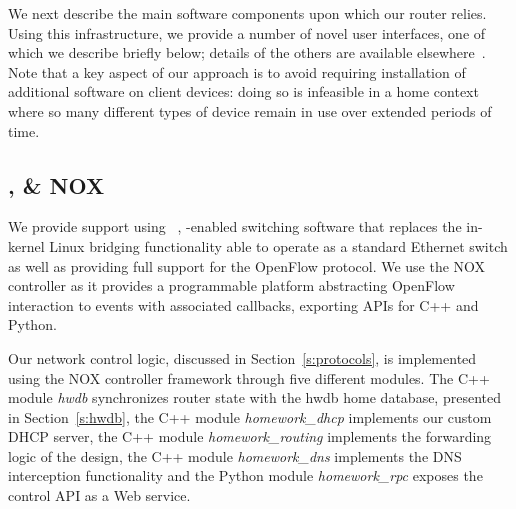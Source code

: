We next describe the main software components upon which our router relies.
Using this infrastructure, we provide a number of novel user interfaces, one of
which we describe briefly below; details of the others are available
elsewhere~\cite{mortier11:_suppor_novel_home_networ_manag}.  Note that a key
aspect of our approach is to avoid requiring installation of additional
software on client devices: doing so is infeasible in a home context where so
many different types of device remain in use over extended periods of time.

\subsection{\of, \ovs \& NOX} \label{s:openflow}

We provide \of support using \ovs~\cite{openvswitch}, \of-enabled switching
software that replaces the in-kernel Linux bridging functionality able to
operate as a standard Ethernet switch as well as providing full support for the
OpenFlow protocol.  We use the NOX~\cite{nox} controller as it provides a
programmable platform abstracting OpenFlow interaction to events with associated
callbacks, exporting APIs for C++ and Python.

Our network control logic, discussed in Section~\ref{s:protocols}, is implemented
using the NOX controller framework through five different modules. The
C++ module {\it hwdb} synchronizes router state with the hwdb home database,
presented in Section~\ref{s:hwdb}, the C++ module {\it homework\_dhcp}
implements our custom DHCP server, the C++ module {\it homework\_routing}
implements the forwarding logic of the design, the C++ module {\it homework\_dns}
implements the DNS interception functionality and the Python module {\it
  homework\_rpc} exposes the control API as a Web service. 


